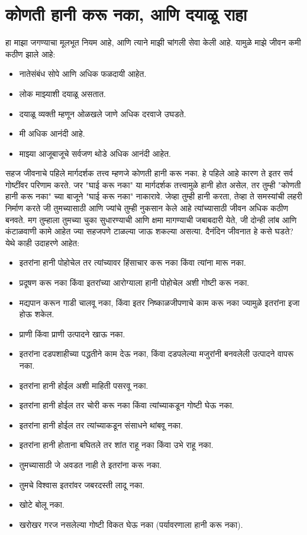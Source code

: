 \chapter{कोणती हानी करू नका, आणि दयाळू राहा}
हा माझा जगण्याचा मूलभूत नियम आहे, आणि त्याने माझी चांगली सेवा केली आहे. यामुळे माझे जीवन कमी कठीण झाले आहे:
\begin{itemize}
\item नातेसंबंध सोपे आणि अधिक फळदायी आहेत.
\item लोक माझ्याशी दयाळू असतात.
\item दयाळू व्यक्ती म्हणून ओळखले जाणे अधिक दरवाजे उघडते.
\item मी अधिक आनंदी आहे.
\item माझ्या आजूबाजूचे सर्वजण थोडे अधिक आनंदी आहेत.
\end{itemize}
सहज जीवनाचे पहिले मार्गदर्शक तत्त्व म्हणजे कोणती हानी करू नका. हे पहिले आहे कारण ते इतर सर्व गोष्टींवर परिणाम करते. जर "घाई करू नका" या मार्गदर्शक तत्त्वामुळे हानी होत असेल, तर तुम्ही "कोणती हानी करू नका" च्या बाजूने "घाई करू नका" नाकारावे.
जेव्हा तुम्ही हानी करता, तेव्हा ते समस्यांची लहरी निर्माण करते जी तुमच्यासाठी आणि ज्यांचे तुम्ही नुकसान केले आहे त्यांच्यासाठी जीवन अधिक कठीण बनवते. मग तुम्हाला तुमच्या चुका सुधारण्याची आणि क्षमा मागण्याची जबाबदारी येते, जी दोन्ही लांब आणि कंटाळवाणी कामे आहेत ज्या सहजपणे टाळल्या जाऊ शकल्या असत्या.
दैनंदिन जीवनात हे कसे घडते? येथे काही उदाहरणे आहेत:
\begin{itemize}
\item इतरांना हानी पोहोचेल तर त्यांच्यावर हिंसाचार करू नका किंवा त्यांना मारू नका.
\item प्रदूषण करू नका किंवा इतरांच्या आरोग्याला हानी पोहोचेल अशी गोष्टी करू नका.
\item मद्यपान करून गाडी चालवू नका, किंवा इतर निष्काळजीपणाचे काम करू नका ज्यामुळे इतरांना इजा होऊ शकेल.
\item प्राणी किंवा प्राणी उत्पादने खाऊ नका.
\item इतरांना दडपशाहीच्या पद्धतीने काम देऊ नका, किंवा दडपलेल्या मजुरांनी बनवलेली उत्पादने वापरू नका.
\item इतरांना हानी होईल अशी माहिती पसरवू नका.
\item इतरांना हानी होईल तर चोरी करू नका किंवा त्यांच्याकडून गोष्टी घेऊ नका.
\item इतरांना हानी होईल तर त्यांच्याकडून संसाधने थांबवू नका.
\item इतरांना हानी होताना बघितले तर शांत राहू नका किंवा उभे राहू नका.
\item तुमच्यासाठी जे अवडत नाही ते इतरांना करू नका.
\item तुमचे विश्वास इतरांवर जबरदस्ती लादू नका.
\item खोटे बोलू नका.
\item खरोखर गरज नसलेल्या गोष्टी विकत घेऊ नका (पर्यावरणाला हानी करू नका).
\end{itemize}

